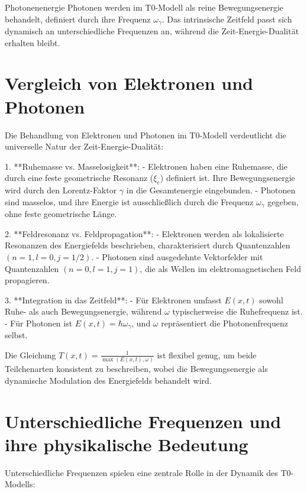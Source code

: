 	\begin{important}{Photonenenergie}{}
		Photonen werden im T0-Modell als reine Bewegungsenergie behandelt, definiert durch ihre Frequenz \(\omega_\gamma\). Das intrinsische Zeitfeld passt sich dynamisch an unterschiedliche Frequenzen an, während die Zeit-Energie-Dualität erhalten bleibt.
	\end{important}
	
	\section{Vergleich von Elektronen und Photonen}
	\label{sec:comparison}
	
	Die Behandlung von Elektronen und Photonen im T0-Modell verdeutlicht die universelle Natur der Zeit-Energie-Dualität:
	
	1. **Ruhemasse vs. Masselosigkeit**:
	- Elektronen haben eine Ruhemasse, die durch eine feste geometrische Resonanz (\(\xi_e\)) definiert ist. Ihre Bewegungsenergie wird durch den Lorentz-Faktor \(\gamma\) in die Gesamtenergie eingebunden.
	- Photonen sind masselos, und ihre Energie ist ausschließlich durch die Frequenz \(\omega_\gamma\) gegeben, ohne feste geometrische Länge.
	
	2. **Feldresonanz vs. Feldpropagation**:
	- Elektronen werden als lokalisierte Resonanzen des Energiefelds beschrieben, charakterisiert durch Quantenzahlen \((n=1, l=0, j=1/2)\).
	- Photonen sind ausgedehnte Vektorfelder mit Quantenzahlen \((n=0, l=1, j=1)\), die als Wellen im elektromagnetischen Feld propagieren.
	
	3. **Integration in das Zeitfeld**:
	- Für Elektronen umfasst \( E(x,t) \) sowohl Ruhe- als auch Bewegungsenergie, während \(\omega\) typischerweise die Ruhefrequenz ist.
	- Für Photonen ist \( E(x,t) = \hbar \omega_\gamma \), und \(\omega\) repräsentiert die Photonenfrequenz selbst.
	
	Die Gleichung \( T(x,t) = \frac{1}{\max(E(x,t), \omega)} \) ist flexibel genug, um beide Teilchenarten konsistent zu beschreiben, wobei die Bewegungsenergie als dynamische Modulation des Energiefelds behandelt wird.
	
	\section{Unterschiedliche Frequenzen und ihre physikalische Bedeutung}
	\label{sec:frequencies}
	
	Unterschiedliche Frequenzen spielen eine zentrale Rolle in der Dynamik des T0-Modells:
	
